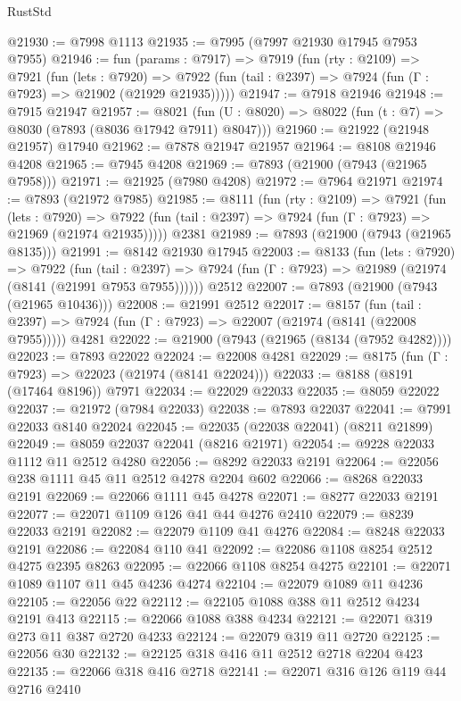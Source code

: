 \begin{lexlean}{RustStd}
\begin{coremodule}
@21930 := @7998 @1113
@21935 := @7995 (@7997 @21930 @17945 @7953 @7955)
@21946 := fun (params : @7917) =>
  @7919
    (fun (rty : @2109) =>
    @7921
      (fun (lets : @7920) =>
      @7922 (fun (tail : @2397) => @7924 (fun (Γ : @7923) => @21902 (@21929 @21935)))))
@21947 := @7918 @21946
@21948 := @7915 @21947
@21957 := @8021
    (fun (U : @8020) => @8022 (fun (t : @7) => @8030 (@7893 (@8036 @17942 @7911) @8047)))
@21960 := @21922 (@21948 @21957) @17940
@21962 := @7878 @21947 @21957
@21964 := @8108 @21946 @4208
@21965 := @7945 @4208
@21969 := @7893 (@21900 (@7943 (@21965 @7958)))
@21971 := @21925 (@7980 @4208)
@21972 := @7964 @21971
@21974 := @7893 (@21972 @7985)
@21985 := @8111
    (fun (rty : @2109) =>
    @7921
      (fun (lets : @7920) =>
      @7922 (fun (tail : @2397) => @7924 (fun (Γ : @7923) => @21969 (@21974 @21935)))))
    @2381
@21989 := @7893 (@21900 (@7943 (@21965 @8135)))
@21991 := @8142 @21930 @17945
@22003 := @8133
    (fun (lets : @7920) =>
    @7922
      (fun (tail : @2397) =>
      @7924 (fun (Γ : @7923) => @21989 (@21974 (@8141 (@21991 @7953 @7955))))))
    @2512
@22007 := @7893 (@21900 (@7943 (@21965 @10436)))
@22008 := @21991 @2512
@22017 := @8157
    (fun (tail : @2397) => @7924 (fun (Γ : @7923) => @22007 (@21974 (@8141 (@22008 @7955)))))
    @4281
@22022 := @21900 (@7943 (@21965 (@8134 (@7952 @4282))))
@22023 := @7893 @22022
@22024 := @22008 @4281
@22029 := @8175 (fun (Γ : @7923) => @22023 (@21974 (@8141 @22024)))
@22033 := @8188 (@8191 (@17464 @8196)) @7971
@22034 := @22029 @22033
@22035 := @8059 @22022
@22037 := @21972 (@7984 @22033)
@22038 := @7893 @22037
@22041 := @7991 @22033 @8140 @22024
@22045 := @22035 (@22038 @22041) (@8211 @21899)
@22049 := @8059 @22037 @22041 (@8216 @21971)
@22054 := @9228 @22033 @1112 @11 @2512 @4280
@22056 := @8292 @22033 @2191
@22064 := @22056 @238 @1111 @45 @11 @2512 @4278 @2204 @602
@22066 := @8268 @22033 @2191
@22069 := @22066 @1111 @45 @4278
@22071 := @8277 @22033 @2191
@22077 := @22071 @1109 @126 @41 @44 @4276 @2410
@22079 := @8239 @22033 @2191
@22082 := @22079 @1109 @41 @4276
@22084 := @8248 @22033 @2191
@22086 := @22084 @110 @41
@22092 := @22086 @1108 @8254 @2512 @4275 @2395 @8263
@22095 := @22066 @1108 @8254 @4275
@22101 := @22071 @1089 @1107 @11 @45 @4236 @4274
@22104 := @22079 @1089 @11 @4236
@22105 := @22056 @22
@22112 := @22105 @1088 @388 @11 @2512 @4234 @2191 @413
@22115 := @22066 @1088 @388 @4234
@22121 := @22071 @319 @273 @11 @387 @2720 @4233
@22124 := @22079 @319 @11 @2720
@22125 := @22056 @30
@22132 := @22125 @318 @416 @11 @2512 @2718 @2204 @423
@22135 := @22066 @318 @416 @2718
@22141 := @22071 @316 @126 @119 @44 @2716 @2410

\end{coremodule}
\end{lexlean}
